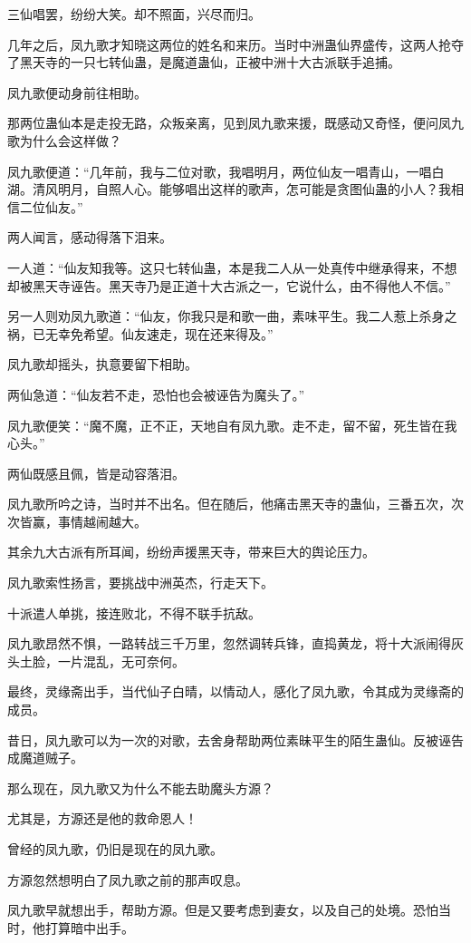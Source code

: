 \begin{this_body}
三仙唱罢，纷纷大笑。却不照面，兴尽而归。

几年之后，凤九歌才知晓这两位的姓名和来历。当时中洲蛊仙界盛传，这两人抢夺了黑天寺的一只七转仙蛊，是魔道蛊仙，正被中洲十大古派联手追捕。

凤九歌便动身前往相助。

那两位蛊仙本是走投无路，众叛亲离，见到凤九歌来援，既感动又奇怪，便问凤九歌为什么会这样做？

凤九歌便道：“几年前，我与二位对歌，我唱明月，两位仙友一唱青山，一唱白湖。清风明月，自照人心。能够唱出这样的歌声，怎可能是贪图仙蛊的小人？我相信二位仙友。”

两人闻言，感动得落下泪来。

一人道：“仙友知我等。这只七转仙蛊，本是我二人从一处真传中继承得来，不想却被黑天寺诬告。黑天寺乃是正道十大古派之一，它说什么，由不得他人不信。”

另一人则劝凤九歌道：“仙友，你我只是和歌一曲，素味平生。我二人惹上杀身之祸，已无幸免希望。仙友速走，现在还来得及。”

凤九歌却摇头，执意要留下相助。

两仙急道：“仙友若不走，恐怕也会被诬告为魔头了。”

凤九歌便笑：“魔不魔，正不正，天地自有凤九歌。走不走，留不留，死生皆在我心头。”

两仙既感且佩，皆是动容落泪。

凤九歌所吟之诗，当时并不出名。但在随后，他痛击黑天寺的蛊仙，三番五次，次次皆赢，事情越闹越大。

其余九大古派有所耳闻，纷纷声援黑天寺，带来巨大的舆论压力。

凤九歌索性扬言，要挑战中洲英杰，行走天下。

十派遣人单挑，接连败北，不得不联手抗敌。

凤九歌昂然不惧，一路转战三千万里，忽然调转兵锋，直捣黄龙，将十大派闹得灰头土脸，一片混乱，无可奈何。

最终，灵缘斋出手，当代仙子白晴，以情动人，感化了凤九歌，令其成为灵缘斋的成员。

昔日，凤九歌可以为一次的对歌，去舍身帮助两位素昧平生的陌生蛊仙。反被诬告成魔道贼子。

那么现在，凤九歌又为什么不能去助魔头方源？

尤其是，方源还是他的救命恩人！

曾经的凤九歌，仍旧是现在的凤九歌。

方源忽然想明白了凤九歌之前的那声叹息。

凤九歌早就想出手，帮助方源。但是又要考虑到妻女，以及自己的处境。恐怕当时，他打算暗中出手。


\end{this_body}
